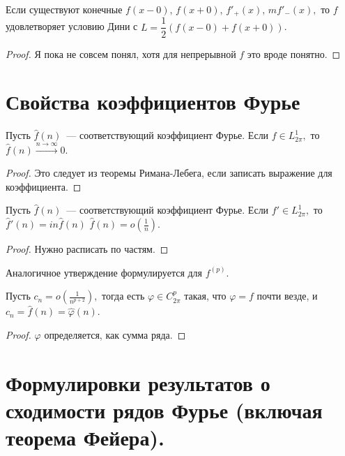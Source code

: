 \documentclass{notes}
\begin{document}
	\begin{cor}
		Если существуют конечные $f(x - 0), \, f(x + 0), \, f'_{+}(x), \, m f'_{-}(x),$ то $f$ удовлетворяет условию Дини с $L = \dfrac{1}{2} (f(x - 0) + f(x + 0))$.
		\begin{proof}
			Я пока не совсем понял, хотя для непрерывной $f$ это вроде понятно.
		\end{proof}
	\end{cor}

\section{Свойства коэффициентов Фурье}
	
	\begin{st}
		Пусть $\hat{f}(n)$~--- соответствующий коэффициент Фурье. Если $f \in L^1_{2\pi},$ то $\hat{f}(n) \xrightarrow{n \to \infty} 0.$
		\begin{proof}
			Это следует из теоремы Римана-Лебега, если записать выражение для коэффициента.
		\end{proof}
	\end{st}

	\begin{st}
		Пусть $\hat{f}(n)$~--- соответствующий коэффициент Фурье. Если $f' \in L^1_{2\pi},$ то $\hat{f}'(n) = in \hat{f}(n)$ $\hat{f}(n) = o(\tfrac{1}{n}).$
		\begin{proof}
			Нужно расписать по частям.
		\end{proof}
	\end{st}

	Аналогичное утверждение формулируется для $f^{(p)}$.

	\begin{st}
		Пусть $c_n = o(\tfrac{1}{n^{p + 2}}),$ тогда есть $\varphi \in C_{2\pi}^p$ такая, что $\varphi = f$ почти везде, и $c_n = \hat{f}(n) = \hat{\varphi}(n)$.
		\begin{proof}
			$\varphi$ определяется, как сумма ряда.
		\end{proof}
	\end{st}

\section{Формулировки результатов о сходимости рядов Фурье (включая теорема Фейера).}
\end{document}

